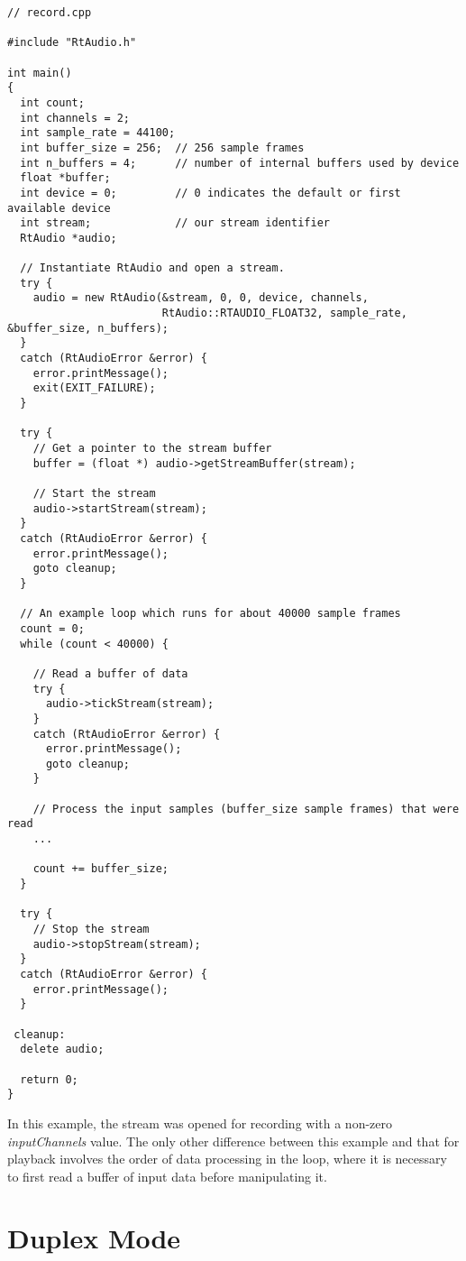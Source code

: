 \footnotesize\begin{verbatim}// record.cpp

#include "RtAudio.h"

int main()
{
  int count;
  int channels = 2;
  int sample_rate = 44100;
  int buffer_size = 256;  // 256 sample frames
  int n_buffers = 4;      // number of internal buffers used by device
  float *buffer;
  int device = 0;         // 0 indicates the default or first available device
  int stream;             // our stream identifier
  RtAudio *audio;

  // Instantiate RtAudio and open a stream.
  try {
    audio = new RtAudio(&stream, 0, 0, device, channels,
                        RtAudio::RTAUDIO_FLOAT32, sample_rate, &buffer_size, n_buffers);
  }
  catch (RtAudioError &error) {
    error.printMessage();
    exit(EXIT_FAILURE);
  }

  try {
    // Get a pointer to the stream buffer
    buffer = (float *) audio->getStreamBuffer(stream);

    // Start the stream
    audio->startStream(stream);
  }
  catch (RtAudioError &error) {
    error.printMessage();
    goto cleanup;
  }

  // An example loop which runs for about 40000 sample frames
  count = 0;
  while (count < 40000) {

    // Read a buffer of data
    try {
      audio->tickStream(stream);
    }
    catch (RtAudioError &error) {
      error.printMessage();
      goto cleanup;
    }

    // Process the input samples (buffer_size sample frames) that were read
    ...

    count += buffer_size;
  }

  try {
    // Stop the stream
    audio->stopStream(stream);
  }
  catch (RtAudioError &error) {
    error.printMessage();
  }

 cleanup:
  delete audio;

  return 0;
}\end{verbatim}\normalsize 


In this example, the stream was opened for recording with a non-zero {\em input\-Channels} value. The only other difference between this example and that for playback involves the order of data processing in the loop, where it is necessary to first read a buffer of input data before manipulating it.

\section{Duplex Mode}\label{duplex}


